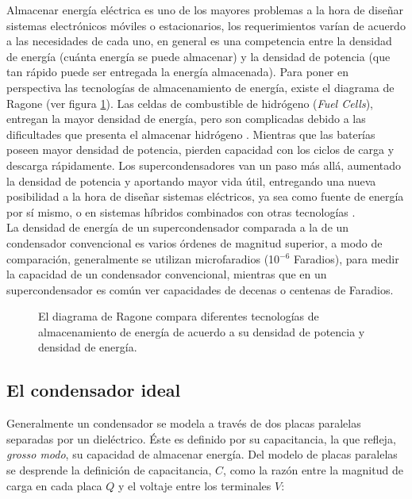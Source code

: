 Almacenar energía eléctrica es uno de los mayores problemas a la hora de diseñar sistemas electrónicos móviles o estacionarios, los requerimientos varían de acuerdo a las necesidades de cada uno, en general es una competencia entre la densidad de energía (cuánta energía se puede almacenar) y la densidad de potencia (que tan rápido puede ser entregada la energía almacenada). Para poner en perspectiva las tecnologías de almacenamiento de energía, existe el diagrama de Ragone (ver figura \ref{fig:ragone}). Las celdas de combustible de hidrógeno (\textit{Fuel Cells}), entregan la mayor densidad de energía, pero son complicadas debido a las dificultades que presenta el almacenar hidrógeno \citep{Hadjipaschalis2009}. Mientras que las baterías poseen mayor densidad de potencia, pierden capacidad con los ciclos de carga y descarga rápidamente. Los supercondensadores van un paso más allá, aumentado la densidad de potencia y aportando mayor vida útil, entregando una nueva posibilidad a la hora de diseñar sistemas eléctricos, ya sea como fuente de energía por sí mismo, o en sistemas híbridos combinados con otras tecnologías \citep{Thounthong2009}.\\
La densidad de energía de un supercondensador comparada a la de un condensador convencional es varios órdenes de magnitud superior, a modo de comparación, generalmente se utilizan microfaradios (10$^{-6}$ Faradios), para medir la capacidad de un condensador convencional, mientras que en un supercondensador es común ver capacidades de decenas o centenas de Faradios.


\begin{figure}
	\centering
	\caption[Diagrama de Ragone, diferentes tecnologías de almacenamiento de energía]{El diagrama de Ragone compara diferentes tecnologías de almacenamiento de energía de acuerdo a su densidad de potencia y densidad de energía.}
	\label{fig:ragone}
\end{figure}

\subsection{El condensador ideal}
Generalmente un condensador se modela a través de dos placas paralelas separadas por un dieléctrico. Éste es definido por su capacitancia, la que refleja, \emph{grosso modo}, su capacidad de almacenar energía. Del modelo de placas paralelas se desprende la definición de capacitancia, $C$, como la razón entre la magnitud de carga en cada placa $Q$ y el voltaje entre los terminales $V$:

